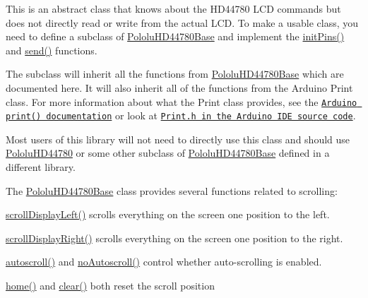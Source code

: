 This is an abstract class that knows about the H\+D44780 L\+CD commands but does not directly read or write from the actual L\+CD. To make a usable class, you need to define a subclass of \hyperlink{class_pololu_h_d44780_base}{Pololu\+H\+D44780\+Base} and implement the \hyperlink{class_pololu_h_d44780_base_a9c2a2e0dfb089a6c21aa12a6a5299750}{init\+Pins()} and \hyperlink{class_pololu_h_d44780_base_a004d5adb9e7c3cc546c6b0ed427dec7b}{send()} functions.

The subclass will inherit all the functions from \hyperlink{class_pololu_h_d44780_base}{Pololu\+H\+D44780\+Base} which are documented here. It will also inherit all of the functions from the Arduino {\ttfamily Print} class. For more information about what the {\ttfamily Print} class provides, see the \href{http://arduino.cc/en/Serial/Print}{\tt Arduino print() documentation} or look at \href{https://github.com/arduino/Arduino/blob/master/hardware/arduino/cores/arduino/Print.h}{\tt Print.\+h in the Arduino I\+DE source code}.

Most users of this library will not need to directly use this class and should use \hyperlink{class_pololu_h_d44780}{Pololu\+H\+D44780} or some other subclass of \hyperlink{class_pololu_h_d44780_base}{Pololu\+H\+D44780\+Base} defined in a different library.

The \hyperlink{class_pololu_h_d44780_base}{Pololu\+H\+D44780\+Base} class provides several functions related to scrolling\+:


\begin{DoxyItemize}
\item \hyperlink{class_pololu_h_d44780_base_aada34a47663585f60b70e1d6f936f6d3}{scroll\+Display\+Left()} scrolls everything on the screen one position to the left.
\item \hyperlink{class_pololu_h_d44780_base_a411512707f303af75de3c5aea313bf48}{scroll\+Display\+Right()} scrolls everything on the screen one position to the right.
\item \hyperlink{class_pololu_h_d44780_base_ad5104d9651fd95704d1ae192073b0d61}{autoscroll()} and \hyperlink{class_pololu_h_d44780_base_aee80e23d270913dd2c353e7bd5408249}{no\+Autoscroll()} control whether auto-\/scrolling is enabled.
\item \hyperlink{class_pololu_h_d44780_base_ab2d24add3c6da0328055bceb38a6d42c}{home()} and \hyperlink{class_pololu_h_d44780_base_a4d35e9a47ceef1a7582e180165e0eae1}{clear()} both reset the scroll position
\end{DoxyItemize}

